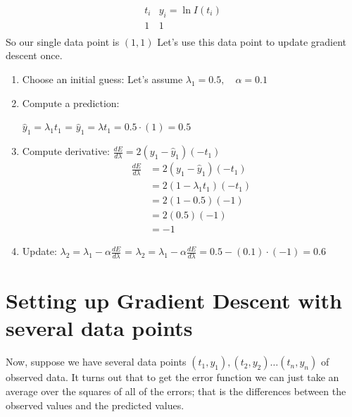 \documentclass[11pt]{article}
\begin{document}
\[
\begin{array}{c|c}
t_i & y_i = \ln I(t_i) \\
\hline
1 & 1 \\
\end{array}
\]
So our single data point is $(1,1)$ Let's use this data point to update gradient descent once.
\begin{enumerate}
\item[(a)] Choose an initial guess:
Let's assume
$\lambda_1 = 0.5, \quad \alpha = 0.1$\\

\item[(b)] Compute a prediction:

$\hat{y}_1 = \lambda_1 t_1$ = {\color{blue}
 \underline{$\hat{y}_1 = \lambda t_1  = 0.5\cdot (1) = 0.5$}
 }
\\
\vspace{3cm}

 
\item[(c)] Compute derivative:
\(
\frac{dE}{d\lambda} = 2(y_1 - \hat{y}_1)(-t_1)
\)
{\color{blue}
\begin{align*}
    \frac{dE}{d\lambda} &= 2(y_1 - \hat{y}_1)(-t_1)\\
    &= 2(1 - \lambda_1 t_1)(-t_1)\\
    &= 2(1 - 0.5)(-1)\\
    &= 2(0.5)(-1)\\
    &= -1
\end{align*}
}
\item[(d)] Update:
$
\lambda_2 = \lambda_1 - \alpha \frac{dE}{d\lambda}$
= 
 {\color{blue}
 \underline{$\lambda_2 = \lambda_1 - \alpha \frac{dE}{d\lambda} = 0.5 - (0.1) \cdot (-1) = 0.6$}
 }
\end{enumerate}
\newpage
\section*{Setting up Gradient Descent with several data points}
Now, suppose we have several data points $(t_1,y_1), (t_2,y_2) \ldots (t_{n},y_{n})$ of observed data.
It turns out that to get the error function we can just take an average over the squares of all of the errors; that is the differences between the observed values and the predicted values.
\vspace{1cm}
\end{document}
